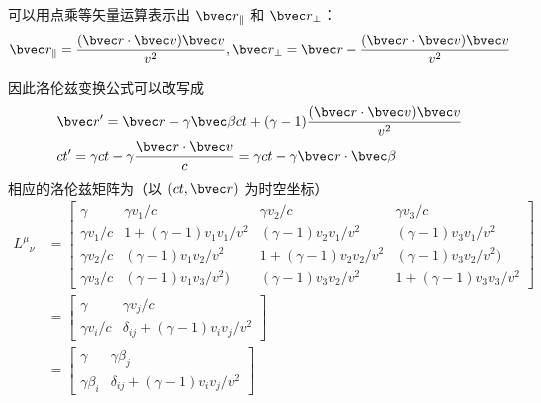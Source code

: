 可以用点乘等矢量运算表示出 $\bvec r_\parallel$ 和 $\bvec r_\perp$：
\begin{equation}
\bvec r_{\parallel}=\frac{(\bvec r\cdot \bvec v)\bvec v}{v^2},\bvec r_{\perp}=\bvec r-\frac{(\bvec r\cdot \bvec v)\bvec v}{v^2}
\end{equation}

因此洛伦兹变换公式可以改写成
\begin{equation}
\begin{aligned}
&\bvec r'=\bvec r-\gamma\bvec \beta ct+(\gamma-1)\frac{(\bvec r\cdot \bvec v)\bvec v}{v^2}\\
&ct'=\gamma ct-\gamma\frac{\bvec r\cdot\bvec v}{c}=\gamma ct-\gamma \bvec r\cdot\bvec \beta
\end{aligned}
\end{equation}
相应的洛伦兹矩阵为（以 $(ct,\bvec r)$ 为时空坐标）
\begin{equation}\label{SRLrtz_eq6}
\begin{aligned}
{L^\mu}_\nu&=
\left[\begin{matrix}
\gamma& \gamma v_1/c & \gamma v_2/c& \gamma v_3/c\\
\gamma v_1/c&1+(\gamma-1)v_1v_1/v^2& (\gamma-1)v_2v_1/v^2&(\gamma-1)v_3v_1/v^2\\
\gamma v_2/c &(\gamma-1)v_1v_2/v^2&1+(\gamma-1)v_2v_2/v^2&(\gamma-1)v_3v_2/v^2)\\
\gamma v_3/c&(\gamma-1)v_1v_3/v^2)&(\gamma-1)v_3v_2/v^2&1+(\gamma-1)v_3v_3/v^2
\end{matrix}\right]\\
&=\left[\begin{matrix}
\gamma & \gamma v_j/c \\
\gamma v_i/c & \delta_{ij}+(\gamma-1)v_iv_j/v^2
\end{matrix}
\right]\\
&=\left[\begin{matrix}
\gamma & \gamma \beta_j \\
\gamma \beta_i & \delta_{ij}+(\gamma-1)v_iv_j/v^2
\end{matrix}
\right]
\end{aligned}
\end{equation}

